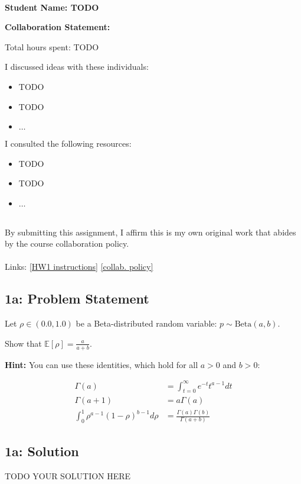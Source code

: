 \documentclass[10pt]{article}
\newcommand{\officialdirections}[1]{{\color{purple} #1}}
\begin{document}
~~\\ %

{\Large{\bf Student Name: TODO}}

\Large{\bf Collaboration Statement:}

Total hours spent: TODO

I discussed ideas with these individuals:
\begin{itemize}
\item TODO
\item TODO
\item $\ldots$	
\end{itemize}

I consulted the following resources:
\begin{itemize}
\item TODO
\item TODO
\item $\ldots$	
\end{itemize}
~~\\
By submitting this assignment, I affirm this is my own original work that abides by the course collaboration policy.
~~\\
~~\\
Links: 
\href{https://www.cs.tufts.edu/cs/136/2024s/hw1.html}{[HW1 instructions]} 
\href{https://www.cs.tufts.edu/cs/136/2024s/index.html#collaboration}{[collab. policy]} 

\tableofcontents

\newpage

\officialdirections{
\subsection*{1a: Problem Statement}

Let $\rho \in (0.0, 1.0)$ be a Beta-distributed random variable: $p \sim \text{Beta}(a, b)$. 

Show that $\mathbb{E}[ \rho ] = \frac{a}{a + b}$.

\textbf{Hint:} You can use these identities, which hold for all $a > 0$ and $b > 0$:

\begin{align}
\Gamma(a) &= \int_{t=0}^{\infty} e^{-t} t^{a-1} dt
\\
\Gamma(a+1) &= a \Gamma(a)
\\
\int_{0}^1 \rho^{a-1} (1-\rho)^{b-1} d\rho &= \frac{\Gamma(a)\Gamma(b)}{\Gamma(a+b)}
\end{align}
}

\subsection{1a: Solution}
TODO YOUR SOLUTION HERE
\end{document}
